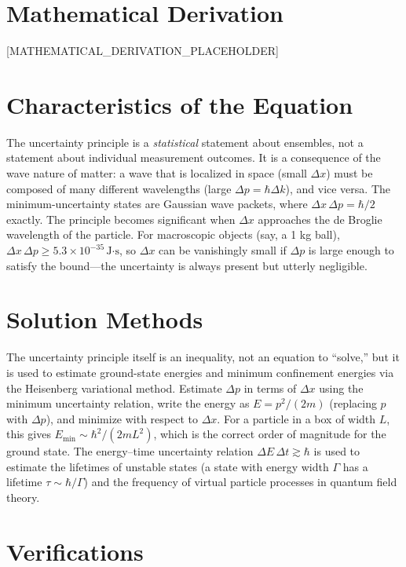 \documentclass[11pt,openright]{book}
\begin{document}
\section*{Mathematical Derivation}

[MATHEMATICAL_DERIVATION_PLACEHOLDER]

\section*{Characteristics of the Equation}

The uncertainty principle is a \emph{statistical} statement about ensembles, not a statement about individual measurement outcomes. It is a consequence of the wave nature of matter: a wave that is localized in space (small $\Delta x$) must be composed of many different wavelengths (large $\Delta p = \hbar\Delta k$), and vice versa. The minimum-uncertainty states are Gaussian wave packets, where $\Delta x\,\Delta p = \hbar/2$ exactly. The principle becomes significant when $\Delta x$ approaches the de Broglie wavelength of the particle. For macroscopic objects (say, a 1 kg ball), $\Delta x\,\Delta p \geq 5.3\times 10^{-35}\,\text{J·s}$, so $\Delta x$ can be vanishingly small if $\Delta p$ is large enough to satisfy the bound---the uncertainty is always present but utterly negligible.
\section*{Solution Methods}

The uncertainty principle itself is an inequality, not an equation to ``solve,'' but it is used to estimate ground-state energies and minimum confinement energies via the Heisenberg variational method. Estimate $\Delta p$ in terms of $\Delta x$ using the minimum uncertainty relation, write the energy as $E = p^2/(2m)$ (replacing $p$ with $\Delta p$), and minimize with respect to $\Delta x$. For a particle in a box of width $L$, this gives $E_{\text{min}} \sim \hbar^2/(2mL^2)$, which is the correct order of magnitude for the ground state. The energy--time uncertainty relation $\Delta E\,\Delta t \gtrsim \hbar$ is used to estimate the lifetimes of unstable states (a state with energy width $\Gamma$ has a lifetime $\tau \sim \hbar/\Gamma$) and the frequency of virtual particle processes in quantum field theory.
\section*{Verifications}
\end{document}

